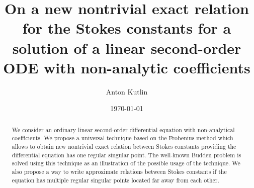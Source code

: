 \documentclass[aip,jmp,reprint]{revtex4-1}
\begin{document}
\title{On a new nontrivial exact relation for the Stokes constants for a solution of 
a linear second-order ODE with non-analytic coefficients}
\author{Anton Kutlin}

\date{\today}

\begin{abstract}
We consider an ordinary linear second-order differential equation with non-analytical coefficients.
We propose a universal technique based on the Frobenius method which allows to obtain new nontrivial 
exact relation between Stokes constants providing the differential equation has one regular singular point.
The well-known Budden problem is solved using this technique as an illustration of the possible usage
of the technique. We also propose a way to write approximate relations between Stokes constants 
if the equation has multiple regular singular points located far away from each other.
\end{abstract}


\maketitle
\end{document}

